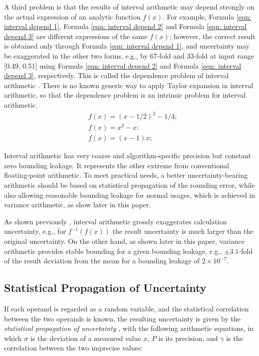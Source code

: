 \documentclass[twoside]{article}
\numberwithin{equation}{section}
\begin{document}
A third problem is that the results of interval arithmetic may depend strongly on the actual expression of an analytic function $f(x)$.  
For example, Formula \eqref{eqn: interval depend 1}, Formula \eqref{eqn: interval depend 2} and Formula \eqref{eqn: interval depend 3} are different expressions of the same $f(x)$; however, the correct result is obtained only through Formula \eqref{eqn: interval depend 1}, and uncertainty may be exaggerated in the other two forms, e.g., by 67-fold and 33-fold at input range [0.49, 0.51] using Formula \eqref{eqn: interval depend 2} and Formula \eqref{eqn: interval depend 3}, respectively.  
This is called the dependence problem of interval arithmetic \cite{Interval_Arithmetic}.  
There is no known generic way to apply Taylor expansion in interval arithmetic, so that the dependence problem is an intrinsic problem for interval arithmetic.
\begin{align}
\label{eqn: interval depend 1} & 
f(x) = (x - 1/2)^2 - 1/4; \\
\label{eqn: interval depend 2} & 
f(x) = x^{2} - x; \\
\label{eqn: interval depend 3} & 
f(x) = (x - 1) x;
\end{align}

Interval arithmetic has very coarse and algorithm-specific precision but constant zero bounding leakage.  
It represents the other extreme from conventional floating-point arithmetic.  
To meet practical needs, a better uncertainty-bearing arithmetic should be based on statistical propagation of the rounding error, while also allowing reasonable bounding leakage for normal usages, which is achieved in variance arithmetic, as show later in this paper.

As shown previously \cite{Prev_Precision_Arithmetic}, interval arithmetic grossly exaggerates calculation uncertainty, e.g., for $f^{-1}(f(x))$ the result uncertainty is much larger than the original uncertainty.
On the other hand, as shown later in this paper, variance arithmetic provides stable bounding for a given bounding leakage, e.g., $\pm 3.1$-fold of the result deviation from the mean for a bounding leakage of $2 \times 10^{-7}$.


\subsection{Statistical Propagation of Uncertainty}

If each operand is regarded as a random variable, and the statistical correlation between the two operands is known, the resulting uncertainty is given by the \emph{statistical propagation of uncertainty} \cite{Statistical_Arithmetic}\cite{Statistical_Analysis}, with the following arithmetic equations, in which $\sigma$ is the deviation of a measured value $x$, $P$ is its precision, and $\gamma$ is the correlation between the two imprecise values:
\end{document}
